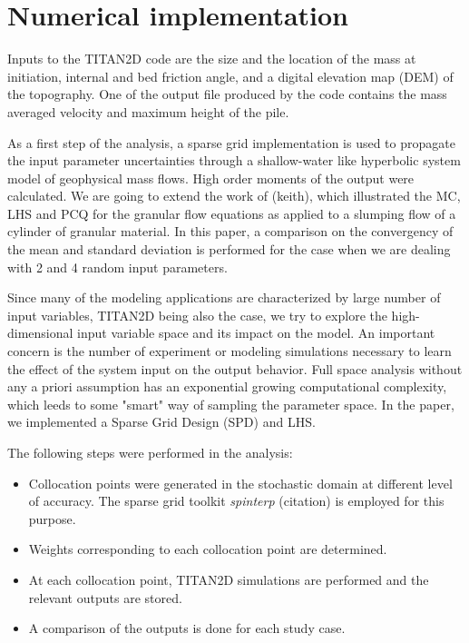 \documentclass{article}
\begin{document}
\section{Numerical implementation}
Inputs to the TITAN2D code are the size and the location of the mass at 
initiation, internal and bed friction angle, and a digital elevation map (DEM)
of the topography. One of the output file produced by the code contains
the mass averaged velocity and maximum height of the pile.

As a first step of the analysis, a sparse grid implementation is used to 
propagate the input parameter uncertainties through a shallow-water 
like hyperbolic system model of geophysical mass flows. High order 
moments of the output were calculated. We are going to extend 
the work of (keith),  which illustrated the MC, LHS and 
PCQ for the granular flow equations as applied to a slumping
flow of a cylinder of granular material.  
In this paper, a comparison on the convergency of the mean and standard
deviation is performed for the case when we are dealing with 2 and 4 random 
input parameters. 


Since many of the modeling applications are characterized by 
large number of input variables, TITAN2D being also the case, we try to
explore the high-dimensional input variable space and its impact on the model.
An important concern is the number of experiment or modeling simulations 
necessary to learn the effect of the system input on the output behavior.
Full space analysis without any a priori assumption has an exponential 
growing computational complexity, which leeds to some "smart" way of sampling
the parameter space. In the paper, we implemented a Sparse Grid Design (SPD) and LHS.

The following steps were performed in the analysis:
\begin{itemize}
\item Collocation points were generated in the stochastic domain
at different level of accuracy. The sparse grid toolkit \textit{spinterp}
(citation) is employed for this purpose.
\item Weights corresponding to each collocation point are determined.
\item At each collocation point, TITAN2D simulations are performed and
the relevant outputs are stored.
\item A comparison of the outputs is done for each study case.  
\end{itemize} 
\end{document}
